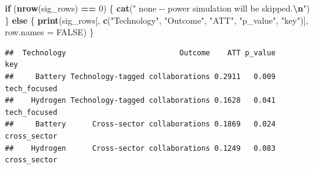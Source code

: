 \documentclass[
]{article}
\newenvironment{Shaded}{\begin{snugshade}}{\end{snugshade}}
\newcommand{\AttributeTok}[1]{\textcolor[rgb]{0.13,0.29,0.53}{#1}}
\newcommand{\ConstantTok}[1]{\textcolor[rgb]{0.56,0.35,0.01}{#1}}
\newcommand{\ControlFlowTok}[1]{\textcolor[rgb]{0.13,0.29,0.53}{\textbf{#1}}}
\newcommand{\DecValTok}[1]{\textcolor[rgb]{0.00,0.00,0.81}{#1}}
\newcommand{\FunctionTok}[1]{\textcolor[rgb]{0.13,0.29,0.53}{\textbf{#1}}}
\newcommand{\NormalTok}[1]{#1}
\newcommand{\SpecialCharTok}[1]{\textcolor[rgb]{0.81,0.36,0.00}{\textbf{#1}}}
\newcommand{\StringTok}[1]{\textcolor[rgb]{0.31,0.60,0.02}{#1}}
\begin{document}
\begin{Shaded}
\begin{Highlighting}[]
\ControlFlowTok{if}\NormalTok{ (}\FunctionTok{nrow}\NormalTok{(sig\_rows) }\SpecialCharTok{==} \DecValTok{0}\NormalTok{) \{}
  \FunctionTok{cat}\NormalTok{(}\StringTok{"  none {-}{-} power simulation will be skipped.}\SpecialCharTok{\textbackslash{}n}\StringTok{"}\NormalTok{)}
\NormalTok{\} }\ControlFlowTok{else}\NormalTok{ \{}
  \FunctionTok{print}\NormalTok{(sig\_rows[, }\FunctionTok{c}\NormalTok{(}\StringTok{"Technology"}\NormalTok{, }\StringTok{"Outcome"}\NormalTok{, }\StringTok{"ATT"}\NormalTok{, }\StringTok{"p\_value"}\NormalTok{, }\StringTok{"key"}\NormalTok{)],}
        \AttributeTok{row.names =} \ConstantTok{FALSE}\NormalTok{)}
\NormalTok{\}}
\end{Highlighting}
\end{Shaded}

\begin{verbatim}
##  Technology                          Outcome    ATT p_value          key
##     Battery Technology-tagged collaborations 0.2911   0.009 tech_focused
##    Hydrogen Technology-tagged collaborations 0.1628   0.041 tech_focused
##     Battery      Cross-sector collaborations 0.1869   0.024 cross_sector
##    Hydrogen      Cross-sector collaborations 0.1249   0.083 cross_sector
\end{verbatim}
\end{document}
